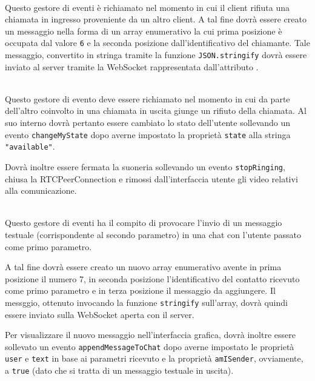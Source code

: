 \begin{description}
  \item{}\\
  Questo gestore di eventi è richiamato nel momento in cui il client rifiuta una chiamata in ingresso proveniente da un altro client. A tal fine dovrà essere creato un messaggio nella forma di un array enumerativo la cui prima posizione è occupata dal valore \verb'6' e la seconda posizione dall'identificativo del chiamante. Tale messaggio, convertito in stringa tramite la funzione \verb'JSON.stringify' dovrà essere inviato al server tramite la WebSocket rappresentata dall'attributo .
  
  \item{}\\
  Questo gestore di evento deve essere richiamato nel momento in cui da parte dell'altro  coinvolto in una chiamata in uscita giunge un rifiuto della chiamata. Al suo interno dovrà pertanto essere cambiato lo stato dell'utente sollevando un evento \verb'changeMyState' dopo averne impostato la proprietà \verb'state' alla stringa \verb'"available"'.
  
  Dovrà inoltre essere fermata la suoneria sollevando un evento \verb'stopRinging', chiusa la RTCPeerConnection e rimossi dall'interfaccia utente gli  video relativi alla comunicazione.
  
  \item{}\\
  Questo gestore di eventi ha il compito di provocare l'invio di un messaggio testuale (corrispondente al secondo parametro) in una chat con l'utente passato come primo parametro.
  
  A tal fine dovrà essere creato un nuovo array enumerativo avente in prima posizione il numero 7, in seconda posizione l'identificativo del contatto ricevuto come primo parametro e in terza posizione il messaggio da aggiungere. Il messggio, ottenuto invocando la funzione \verb'stringify' sull'array, dovrà quindi essere inviato sulla WebSocket aperta con il server.
  
  Per visualizzare il nuovo messaggio nell'interfaccia grafica, dovrà inoltre essere sollevato un evento \verb'appendMessageToChat' dopo averne impostato le proprietà \verb'user' e \verb'text' in base ai parametri ricevuto e la proprietà \verb'amISender', ovviamente, a \verb'true' (dato che si tratta di un messaggio testuale in uscita).
  

\end{description}
